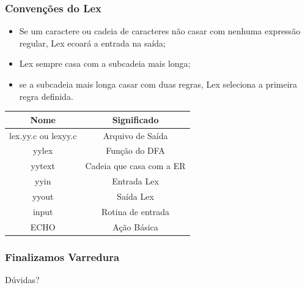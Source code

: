 \documentclass[table]{beamer}
\begin{document}
\begin{frame}
   \frametitle{Convenções do Lex}
   \begin{itemize}
      \item Se um caractere ou cadeia de caracteres não casar com nenhuma expressão regular, Lex ecoará a entrada na saída;
      \item Lex sempre casa com a subcadeia mais longa;
      \item se a subcadeia mais longa casar com duas regras, Lex seleciona a primeira regra definida.
   \end{itemize}

   \begin{table}
      \begin{tabular}{c|c}
      \hline
      Nome & Significado \\
      \hline 
      lex.yy.c ou lexyy.c & Arquivo de Saída \\
      yylex & Função do DFA \\
      yytext & Cadeia que casa com a ER \\
      yyin & Entrada Lex \\
      yyout & Saída Lex \\
      input & Rotina de entrada \\
      ECHO & Ação Básica \\
      \hline
      \end{tabular}
   \end{table}
\end{frame}

\begin{frame}
   \frametitle{Finalizamos Varredura}
   Dúvidas?
\end{frame}
\end{document}
